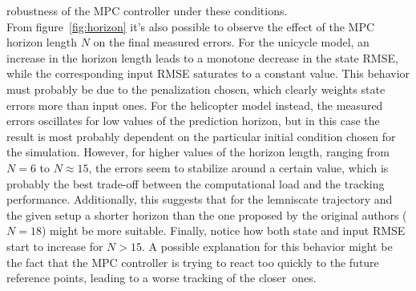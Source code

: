 \documentclass[../main.tex]{subfiles}
\begin{document}
robustness of the MPC controller under these conditions.\\
From figure~\ref{fig:horizon} it's also possible to observe the effect of the
MPC horizon length $N$ on the final measured errors. For the unicycle model, an
increase in the horizon length leads to a monotone decrease in the state RMSE,
while the corresponding input RMSE saturates to a constant value.
This behavior must probably be due to the penalization chosen,
which clearly weights state errors more than input ones. For the
helicopter model instead, the measured errors oscillates for low values of the
prediction horizon, but in this case the result is most probably dependent on
the particular initial condition chosen for the simulation. However, for higher
values of the horizon length, ranging from $N=6$ to $N \approx 15$, the errors
seem to stabilize around a certain value, which is probably the best trade-off
between the computational load and the tracking performance. Additionally, this
suggests that for the lemniscate trajectory and the given setup a shorter horizon
than the one proposed by the original authors ($N=18$) might be more suitable.
Finally, notice how both state and input RMSE start to increase for $N > 15$. A
possible explanation for this behavior might be the fact that the MPC controller
is trying to react too quickly to the future reference points, leading to a
worse tracking of the closer~ones.
\end{document}
